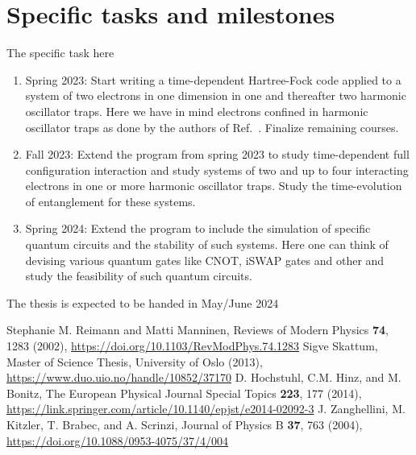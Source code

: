 \documentclass{article}
\begin{document}
\section*{Specific tasks and milestones}

The specific task here 

\begin{enumerate}
    \item Spring 2023: Start writing a time-dependent Hartree-Fock code applied to a system of two electrons in one dimension in one and thereafter two harmonic oscillator traps. Here we have in mind electrons confined in harmonic oscillator traps as done by the authors of Ref.~\cite{Zanghellini2004}. Finalize remaining courses. 
    \item Fall 2023: Extend the program from spring 2023 to study time-dependent full configuration interaction \cite{Skattum2013,Hochstuhl2014} and study systems of two and up to four interacting electrons in one or more harmonic oscillator traps. Study the time-evolution of entanglement for these systems.
    \item Spring 2024: Extend the program to include the simulation of specific quantum circuits and the stability of such systems. Here one can think of devising various quantum gates like CNOT, iSWAP gates and other and study the feasibility of such quantum circuits.
\end{enumerate}
The thesis is expected to be handed in May/June 2024


\begin{thebibliography}{99}

 Stephanie M. Reimann and Matti Manninen, Reviews of  Modern Physics {\bf 74}, 1283 (2002), \url{https://doi.org/10.1103/RevModPhys.74.1283}
 Sigve Skattum, Master of Science Thesis, University of Oslo (2013), \url{https://www.duo.uio.no/handle/10852/37170}  
 D. Hochstuhl, C.M. Hinz, and M. Bonitz, The European Physical Journal Special Topics {\bf 223}, 177 (2014), \url{https://link.springer.com/article/10.1140/epjst/e2014-02092-3}
 J. Zanghellini, M. Kitzler, T. Brabec, and A. Scrinzi, Journal of Physics  B {\bf 37}, 763 (2004), \url{https://doi.org/10.1088/0953-4075/37/4/004}

\end{thebibliography}  
\end{document}
